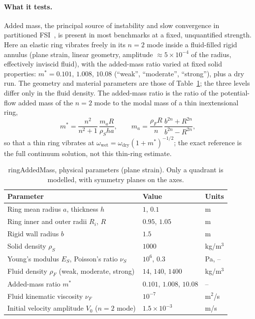 \paragraph{What it tests.}
Added mass, the principal source of instability and slow convergence in partitioned FSI~\citep{Causin2005}, is present in most benchmarks at a fixed, unquantified strength.
Here an elastic ring vibrates freely in its $n=2$ mode inside a fluid-filled rigid annulus (plane strain, linear geometry, amplitude $\approx5\times10^{-4}$ of the radius, effectively inviscid fluid), with the added-mass ratio varied at fixed solid properties: $m^* = 0.101$, $1.008$, $10.08$ (``weak'', ``moderate'', ``strong''), plus a dry run.
The geometry and material parameters are those of Table~\ref{tab:ring_params}; the three levels differ only in the fluid density.
The added-mass ratio is the ratio of the potential-flow added mass of the $n=2$ mode to the modal mass of a thin inextensional ring,
\begin{equation}
m^* = \frac{n^2}{n^2+1}\,\frac{m_a R}{\rho_S h a},
\qquad
m_a = \frac{\rho_F R}{n}\,\frac{b^{2n}+R^{2n}}{b^{2n}-R^{2n}},
\end{equation}
so that a thin ring vibrates at $\omega_{\mathrm{wet}} = \omega_{\mathrm{dry}}(1+m^*)^{-1/2}$; the exact reference is the full continuum solution, not this thin-ring estimate.
\begin{table}[htbp]
	\centering
	\small
	\caption{ringAddedMass, physical parameters (plane strain). Only a quadrant is modelled, with symmetry planes on the axes.}
	\label{tab:ring_params}
	\begin{tabular}{lll}
		\toprule
		Parameter & Value & Units \\
		\midrule
		Ring mean radius $a$, thickness $h$ & $1$, $0.1$ & m \\
		Ring inner and outer radii $R_i$, $R$ & $0.95$, $1.05$ & m \\
		Rigid wall radius $b$ & $1.5$ & m \\
		Solid density $\rho_S$ & $1000$ & kg/m$^3$ \\
		Young's modulus $E_S$, Poisson's ratio $\nu_S$ & $10^{6}$, $0.3$ & Pa, -- \\
		Fluid density $\rho_F$ (weak, moderate, strong) & $14$, $140$, $1400$ & kg/m$^3$ \\
		Added-mass ratio $m^*$ & $0.101$, $1.008$, $10.08$ & -- \\
		Fluid kinematic viscosity $\nu_F$ & $10^{-7}$ & m$^2$/s \\
		Initial velocity amplitude $V_0$ ($n=2$ mode) & $1.5\times10^{-3}$ & m/s \\
		\bottomrule
	\end{tabular}
\end{table}

